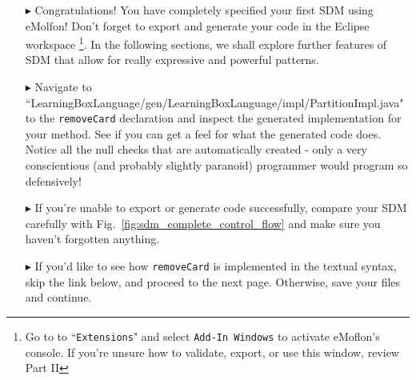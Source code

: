 \begin{itemize}

\item[$\blacktriangleright$] Congratulations! You have completely specified your first SDM using eMolfon! Don't forget to export and generate your code in the
Eclipse workspace \footnote{Go to to ``\texttt{Extensions}" and select \texttt{Add-In Windows} to activate eMoflon's console. If you're unsure how to validate,
export, or use this window, review Part II}. In the following sections, we shall explore further features of SDM that allow for really expressive and powerful patterns.

\item[$\blacktriangleright$] Navigate to ``Learning\-Box\-Language/\-gen/\-Learning\-Box\-Language/\-impl/\-Partition\-Impl.java" to the \texttt{\-remove\-Card}
declaration and inspect the generated implementation for your method. See if you can get a feel for what the generated code does. Notice all the null checks
that are automatically created - only a very conscientious (and probably slightly paranoid) programmer would program so defensively!

\item[$\blacktriangleright$] If you're unable to export or generate code successfully, compare your SDM carefully with Fig.~\ref{fig:sdm_complete_control_flow}
and make sure you haven't forgotten anything.

\item[$\blacktriangleright$] If you'd like to see how \texttt{removeCard} is implemented in the textual syntax, skip the link below, and proceed to the
next page. Otherwise, save your files and continue.


\end{itemize}

